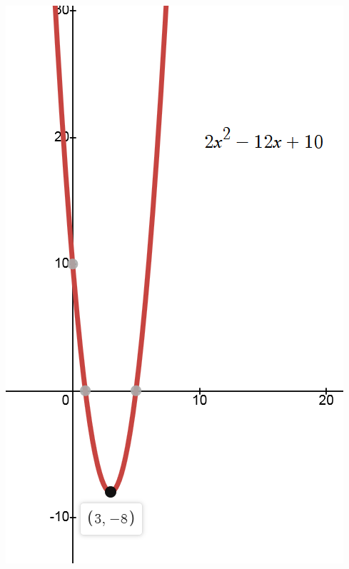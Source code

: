 \documentclass[a4paper,12pt]{article}
\begin{document}
\begin{enumerate}
    \begin{center}
        \includegraphics[scale=0.4]{Figur 7.png}
    \end{center}


\end{enumerate}
\end{document}
